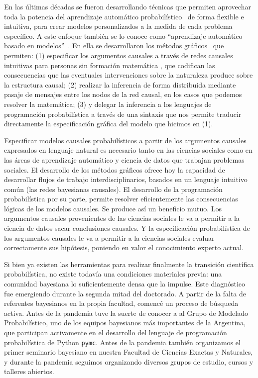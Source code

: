 \documentclass[a4paper,11pt]{book}
\theoremstyle{definition}
\begin{document}

En las últimas décadas se fueron desarrollando técnicas que permiten aprovechar toda la potencia del aprendizaje automático probabilístico~\cite{murphy-pmlBook1,murphy-pmlBook2} de forma flexible e intuitiva, para crear modelos personalizados a la medida de cada problema específico.
%
A este enfoque también se lo conoce como ``aprendizaje automático basado en modelos''~\cite{Bishop2013, bishop2006}.
%
En ella se desarrollaron los métodos gráficos~\cite{pearl1986-beliefNetworks, kschischang2001-factorGraphsAndTheSumProductAlgorithm, koller2009-PGM} que permiten: (1) especificar los argumentos causales a través de redes causales intuitivas para personas sin formación matemática , que codifican las consecuencias que las eventuales intervenciones sobre la naturaleza produce sobre la estructura causal; (2) realizar la inferencia de forma distribuida mediante pasaje de mensajes entre los nodos de la red causal, en los casos que podemos resolver la matemática; (3) y delegar la inferencia a los lenguajes de programación probabilística a través de una sintaxis que nos permite traducir directamente la especificación gráfica del modelo que hicimos en (1).


Especificar modelos causales probabilísticos a partir de los argumentos causales expresados en lenguaje natural es necesario tanto en las ciencias sociales como en las áreas de aprendizaje automático y ciencia de datos que trabajan problemas sociales.
%
El desarrollo de los métodos gráficos ofrece hoy la capacidad de desarrollar flujos de trabajo interdisciplinarios, basados en un lenguaje intuitivo común (las redes bayesianas causales).
%
El desarrollo de la programación probabilística por su parte, permite resolver eficientemente las consecuencias lógicas de los modelos causales.
%
Se produce así un beneficio mutuo.
%
Los argumentos causales provenientes de las ciencias sociales le va a permitir a la ciencia de datos sacar conclusiones causales.
%
Y la especificación probabilística de los argumentos causales  le va a permitir a la ciencias sociales evaluar correctamente sus hipótesis, poniendo en valor el conocimiento experto actual.


Si bien ya existen las herramientas para realizar finalmente la transición científica probabilística, no existe todavía una condiciones materiales previa: una comunidad bayesiana lo suficientemente densa que la impulse.
%
Este diagnóstico fue emergiendo durante la segunda mitad del doctorado.
%
A partir de la falta de referentes bayesianos en la propia facultad, comencé un proceso de búsqueda activa.
%
Antes de la pandemia tuve la suerte de conocer a al Grupo de Modelado Probabilístico, uno de los equipos bayesianos más importantes de la Argentina, que participan activamente en el desarrollo del lenguaje de programación probabilística de Python \texttt{pymc}.
%
Antes de la pandemia también organizamos el primer seminario bayesiano en nuestra Facultad de Ciencias Exactas y Naturales, y durante la pandemia seguimos organizando diversos grupos de estudio, cursos y talleres abiertos.
\end{document}
